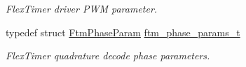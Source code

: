 \begin{DoxyCompactItemize}
\begin{DoxyCompactList}\small\item\em Flex\+Timer driver P\+WM parameter. \end{DoxyCompactList}\item 
typedef struct \hyperlink{structFtmPhaseParam}{Ftm\+Phase\+Param} \hyperlink{group__ftm__hal_ga4622903c3f710f86e9f04c5b29220c7c}{ftm\+\_\+phase\+\_\+params\+\_\+t}\hypertarget{group__ftm__hal_ga4622903c3f710f86e9f04c5b29220c7c}{}\label{group__ftm__hal_ga4622903c3f710f86e9f04c5b29220c7c}

\begin{DoxyCompactList}\small\item\em Flex\+Timer quadrature decode phase parameters. \end{DoxyCompactList}\end{DoxyCompactItemize}
